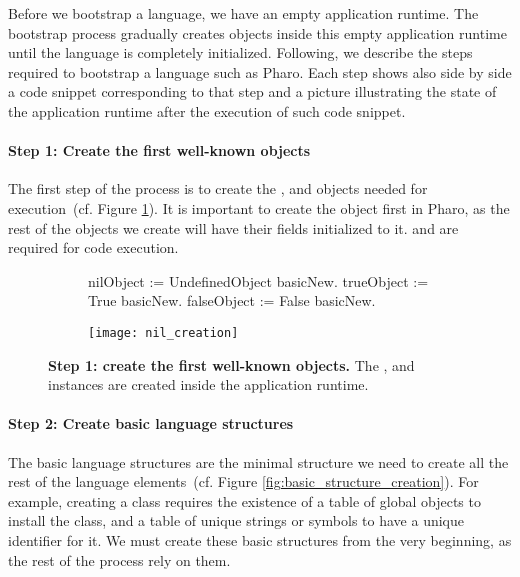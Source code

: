 Before we bootstrap a language, we have an empty application runtime. The bootstrap process gradually creates objects inside this empty application runtime until the language is completely initialized. Following, we describe the steps required to bootstrap a language such as Pharo. Each step shows also side by side a code snippet corresponding to that step and a picture illustrating the state of the application runtime after the execution of such code snippet.

\paragraph{\textbf{Step 1: Create the first well-known objects}}\label{sec:create_nil}

The first step of the process is to create the ,  and  objects needed for execution~(cf. Figure \ref{fig:nil_creation}). It is important to create the  object first in Pharo, as the rest of the objects we create will have their fields initialized to it.  and  are required for code execution.

\begin{figure}[ht]
\begin{subfigure}{.4\linewidth}
\begin{code}
nilObject := UndefinedObject basicNew.
trueObject := True basicNew.
falseObject := False basicNew.
\end{code}
\end{subfigure}
\begin{subfigure}{.6\linewidth}
\texttt{[image: nil\_creation]}
\end{subfigure}
\caption{\textbf{Step 1: create the first well-known objects.} The ,  and  instances are created inside the application runtime.\label{fig:nil_creation}}
\end{figure}


\paragraph{\textbf{Step 2: Create basic language structures}}

The basic language structures are the minimal structure we need to create all the rest of the language elements~(cf. Figure \ref{fig:basic_structure_creation}). For example, creating a class requires the existence of a table of global objects to install the class, and a table of unique strings or symbols to have a unique identifier for it. We must create these basic structures from the very beginning, as the rest of the process rely on them.

